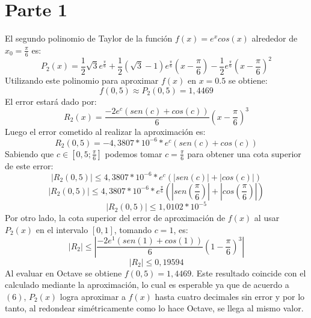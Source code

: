 \documentclass[titlepage,a4paper]{article}
\begin{document}
\section{Parte 1}\label{sec:parte1}
El segundo polinomio de Taylor de la función $ f(x) = e^xcos(x) $ alrededor de $ x_0 = \frac{\pi}{6} $ es:
	\begin{equation}
	P_2(x) = \frac{1}{2}\sqrt{3}e^{\frac{\pi}{6}} + \frac{1}{2}(\sqrt{3} - 1)e^{\frac{\pi}{6}}(x - \frac{\pi}{6}) - \frac{1}{2}e^{\frac{\pi}{6}}(x - \frac{\pi}{6})^2
	\end{equation}
Utilizando este polinomio para aproximar $ f(x) $ en $ x = 0.5 $ se obtiene:
	\begin{equation}
	f(0,5) \approx P_2(0,5) = 1,4469
	\end{equation}
El error estará dado por:
	\begin{equation}
	R_2(x) = \frac{-2e^{c}(sen(c) + cos(c))}{6}(x - \frac{\pi}{6})^3
	\end{equation}
Luego el error cometido al realizar la aproximación es:
	\begin{equation*}
	R_2(0,5) = -4,3807*10^{-6}*e^{c}(sen(c) + cos(c))
	\end{equation*}
Sabiendo que $ c \in [0,5 ; \frac{\pi}{6}] $ podemos tomar $ c = \frac{\pi}{6} $ para obtener una cota superior de este error:
	\begin{equation*}
	| R_2(0,5) | \leq 4,3807*10^{-6}*e^{c}(|sen(c)| + |cos(c)|)
	\end{equation*}
	\begin{equation*}
	| R_2(0,5) | \leq 4,3807*10^{-6}*e^{\frac{\pi}{6}}(|sen(\frac{\pi}{6})| + |cos(\frac{\pi}{6})|)
	\end{equation*}
	\begin{equation}
	| R_2(0,5) | \leq 1,0102*10^{-5}
	\end{equation}
Por otro lado, la cota superior del error de aproximación de $ f(x) $ al usar $ P_2(x) $ en el intervalo $ [0, 1] $, tomando $ c=1 $, es:
	\begin{equation*}
	| R_2 | \leq | \frac{-2e^{1}(sen(1) + cos(1))}{6}(1 - \frac{\pi}{6})^3 |
	\end{equation*}
	\begin{equation}
	| R_2 | \leq 0,19594
	\end{equation}
Al evaluar en Octave se obtiene $ f(0,5) = 1,4469 $. Este resultado coincide con el calculado mediante la aproximación, lo cual es esperable ya que de acuerdo a $(6)$, $P_2(x)$ logra aproximar a $f(x)$ hasta cuatro decimales sin error y por lo tanto, al redondear simétricamente como lo hace Octave, se llega al mismo valor.
\end{document}
